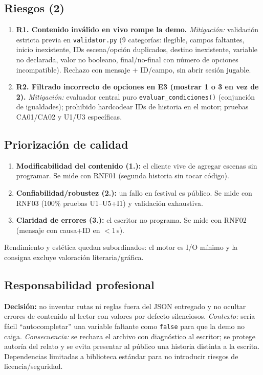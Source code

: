\documentclass[11pt,a4paper]{article}
\begin{document}
\subsection{Riesgos (2)}
\begin{enumerate}
\item \textbf{R1. Contenido inv\'alido en vivo rompe la demo.} \textit{Mitigaci\'on:} validaci\'on estricta previa en \texttt{validator.py} (9 categor\'ias: ilegible, campos faltantes, inicio inexistente, IDs escena/opci\'on duplicados, destino inexistente, variable no declarada, valor no booleano, final/no-final con n\'umero de opciones incompatible). Rechazo con mensaje + ID/campo, sin abrir sesi\'on jugable.
\item \textbf{R2. Filtrado incorrecto de opciones en E3 (mostrar 1 o 3 en vez de 2).} \textit{Mitigaci\'on:} evaluador central puro \texttt{evaluar\_condiciones()} (conjunci\'on de igualdades); prohibido hardcodear IDs de historia en el motor; pruebas CA01/CA02 y U1/U3 espec\'ificas.
\end{enumerate}

\subsection{Priorizaci\'on de calidad}
\begin{enumerate}
\item \textbf{Modificabilidad del contenido (1.\textordmasculine):} el cliente vive de agregar escenas sin programar. Se mide con RNF01 (segunda historia sin tocar c\'odigo).
\item \textbf{Confiabilidad/robustez (2.\textordmasculine):} un fallo en festival es p\'ublico. Se mide con RNF03 (100\% pruebas U1--U5+I1) y validaci\'on exhaustiva.
\item \textbf{Claridad de errores (3.\textordmasculine):} el escritor no programa. Se mide con RNF02 (mensaje con causa+ID en $<1$\,s).
\end{enumerate}
Rendimiento y est\'etica quedan subordinados: el motor es I/O m\'inimo y la consigna excluye valoraci\'on literaria/gr\'afica.

\subsection{Responsabilidad profesional}
\textbf{Decisi\'on:} no inventar rutas ni reglas fuera del JSON entregado y no ocultar errores de contenido al lector con valores por defecto silenciosos. \textit{Contexto:} ser\'ia f\'acil ``autocompletar'' una variable faltante como \texttt{false} para que la demo no caiga. \textit{Consecuencia:} se rechaza el archivo con diagn\'ostico al escritor; se protege autor\'ia del relato y se evita presentar al p\'ublico una historia distinta a la escrita. Dependencias limitadas a biblioteca est\'andar para no introducir riesgos de licencia/seguridad.
\end{document}
